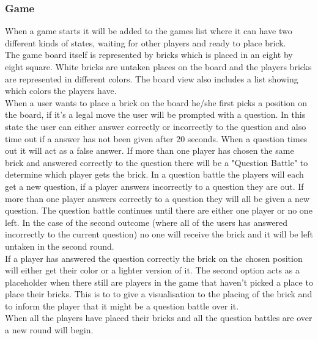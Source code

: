\subsubsection{Game}
When a game starts it will be added to the games list where it can have two different kinds of states, waiting for other players and ready to place brick.\\
The game board itself is represented by bricks which is placed in an eight by eight square. White bricks are untaken places on the board and the players bricks are represented in different colors. The board view also includes a list showing which colors the players have.\\
When a user wants to place a brick on the board he/she first picks a position on the board, if it's a legal move the user will be prompted with a question. In this state the user can either answer correctly or incorrectly to the question and also time out if a answer has not been given after 20 seconds. When a question times out it will act as a false answer. If more than one player has chosen the same brick and answered correctly to the question there will be a "Question Battle" to determine which player gets the brick. In a question battle the players will each get a new question, if a player answers incorrectly to a question they are out. If more than one player answers correctly to a question they will all be given a new question. The question battle continues until there are either one player or no one left. In the case of the second outcome (where all of the users has answered incorrectly to the current question) no one will receive the brick and it will be left untaken in the second round.\\
If a player has answered the question correctly the brick on the chosen position will either get their color or a lighter version of it. The second option acts as a placeholder when there still are players in the game that haven't picked a place to place their bricks. This is to to give a visualisation to the placing of the brick and to inform the player that it might be a question battle over it.\\ 
When all the players have placed their bricks and all the question battles are over a new round will begin.
